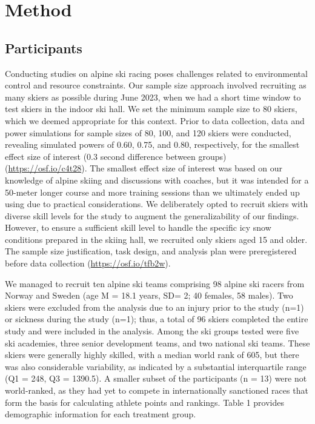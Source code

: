 \documentclass[pdflatex,sn-mathphys-num]{sn-jnl}%
\theoremstyle{thmstyleone}%
\theoremstyle{thmstyletwo}%
\theoremstyle{thmstylethree}%
\begin{document}
\section{Method}


\subsection{Participants}
Conducting studies on alpine ski racing poses challenges related to environmental control and resource constraints. Our sample size approach involved recruiting as many skiers as possible during June 2023, when we had a short time window to test skiers in the indoor ski hall. We set the minimum sample size to 80 skiers, which we deemed appropriate for this context. Prior to data collection, data and power simulations for sample sizes of 80, 100, and 120 skiers were conducted, revealing simulated powers of 0.60, 0.75, and 0.80, respectively, for the smallest effect size of interest (0.3 second difference between groups) (\url{https://osf.io/c4t28}). The smallest effect size of interest was based on our knowledge of alpine skiing and discussions with coaches, but it was intended for a 50-meter longer course and more training sessions than we ultimately ended up using due to practical considerations. We deliberately opted to recruit skiers with diverse skill levels for the study to augment the generalizability of our findings. However, to ensure a sufficient skill level to handle the specific icy snow conditions prepared in the skiing hall, we recruited only skiers aged 15 and older. The sample size justification, task design, and analysis plan were preregistered before data collection (\url{https://osf.io/tfb2w}).

We managed to recruit ten alpine ski teams comprising 98 alpine ski racers from Norway and Sweden (age M = 18.1 years, SD= 2; 40 females, 58 males). Two skiers were excluded from the analysis due to an injury prior to the study (n=1) or sickness during the study (n=1); thus, a total of 96 skiers completed the entire study and were included in the analysis.  Among the ski groups tested were five ski academies, three senior development teams, and two national ski teams. These skiers were generally highly skilled, with a median world rank of 605, but there was also considerable variability, as indicated by a substantial interquartile range (Q1 = 248, Q3 = 1390.5). A smaller subset of the participants (n = 13) were not world-ranked,  as they had yet to compete in internationally sanctioned races that form the basis for calculating athlete points and rankings. Table 1 provides demographic information for each treatment group.
\end{document}
